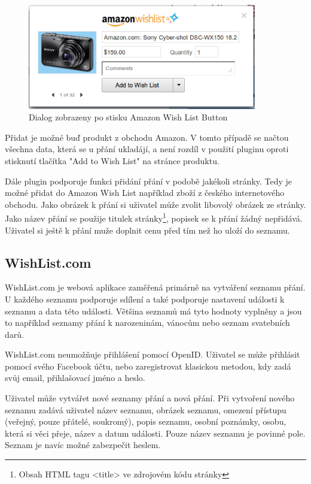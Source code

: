 \begin{figure}[htb]
\begin{center}
\includegraphics[width=100mm]{./pictures/amazon-wishlist-plugin.png}
\caption{Dialog zobrazeny po stisku Amazon Wish List Button}
\label{fig:amazon-wishlist-plugin}
\end{center}
\end{figure}

Přidat je možné buď produkt z obchodu Amazon. V tomto případě se načtou všechna data, která se u přání ukladájí, a není rozdíl v použití pluginu oproti stisknutí tlačítka "Add to Wish List" na stránce produktu.

Dále plugin podporuje funkci přidání přání v podobě jakékoli stránky. Tedy je možné přidat do Amazon Wish List například zboží z českého internetového obchodu. Jako obrázek k přání si uživatel může zvolit libovolý obrázek ze stránky. Jako název přání se použije titulek stránky\footnote{Obsah HTML tagu <title> ve zdrojovém kódu stránky}, popisek se k přání žádný nepřidává. Uživatel si ještě k přání muže doplnit cenu před tím než ho uloží do seznamu.

\subsection{WishList.com}
WishList.com je webová aplikace zaměřená primárně na vytváření seznamu přání. U každého seznamu podporuje sdílení a také podporuje nastavení události k seznamu a data této události. Většina seznamů má tyto hodnoty vyplněny a jsou to například seznamy přání k narozeninám, vánocům nebo seznam svatebních darů.

WishList.com neumožňuje přihlášení pomocí OpenID. Uživatel se může přihlásit pomocí svého Facebook účtu, nebo zaregistrovat klasickou metodou, kdy zadá svůj email, přihlašovací jméno a heslo.

Uživatel může vytvářet nové seznamy přání a nová přání. Při vytvoření nového seznamu zadává uživatel název seznamu, obrázek seznamu, omezení přístupu (veřejný, pouze přátelé, soukromý), popis seznamu, osobní poznámky, osobu, která si věci přeje, název a datum události. Pouze název seznamu je povinné pole. Seznam je navíc možné zabezpečit heslem.


